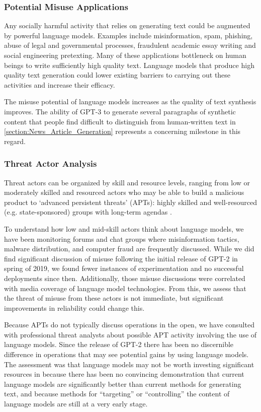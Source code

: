 \documentclass{article}
\begin{document}
        \subsubsection{Potential Misuse Applications}
        \label{section:Potential_Misuse_Applications}
Any socially harmful activity that relies on generating text could be augmented by powerful language models. Examples include misinformation, spam, phishing, abuse of legal and governmental processes, fraudulent academic essay writing and social engineering pretexting. Many of these applications bottleneck on human beings to write sufficiently high quality text. Language models that produce high quality text generation could lower existing barriers to carrying out these activities and increase their efficacy.

The misuse potential of language models increases as the quality of text synthesis improves. The ability of GPT-3 to generate several paragraphs of synthetic content that people find difficult to distinguish from human-written text in \ref{section:News_Article_Generation} represents a concerning milestone in this regard.
    
        \subsubsection{Threat Actor Analysis}
        \label{section:Threat_Actor_Analysis}
Threat actors can be organized by skill and resource levels, ranging from low or moderately skilled and resourced actors who may be able to build a malicious product to `advanced persistent threats' (APTs): highly skilled and well-resourced (e.g. state-sponsored) groups with long-term agendas \cite{solaiman2019release}.

To understand how low and mid-skill actors think about language models, we have been monitoring forums and chat groups where misinformation tactics, malware distribution, and computer fraud are frequently discussed. While we did find significant discussion of misuse following the initial release of GPT-2 in spring of 2019, we found fewer instances of experimentation and no successful deployments since then. Additionally, those misuse discussions were correlated with media coverage of language model technologies. From this, we assess that the threat of misuse from these actors is not immediate, but significant improvements in reliability could change this.

Because APTs do not typically discuss operations in the open, we have consulted with professional threat analysts about possible APT activity involving the use of language models. Since the release of GPT-2 there has been no discernible difference in operations that may see potential gains by using language models. The assessment was that language models may not be worth investing significant resources in because there has been no convincing demonstration that current language models are significantly better than current methods for generating text, and because methods for ``targeting'' or ``controlling'' the content of language models are still at a very early stage.
\end{document}
